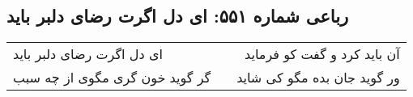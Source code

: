 \begin{center}
\section*{رباعی شماره ۵۵۱: ای دل اگرت رضای دلبر باید}
\label{sec:0551}
\begin{longtable}{l p{0.5cm} r}
ای دل اگرت رضای دلبر باید
&&
آن باید کرد و گفت کو فرماید
\\
گر گوید خون گری مگوی از چه سبب
&&
ور گوید جان بده مگو کی شاید
\\
\end{longtable}
\end{center}
